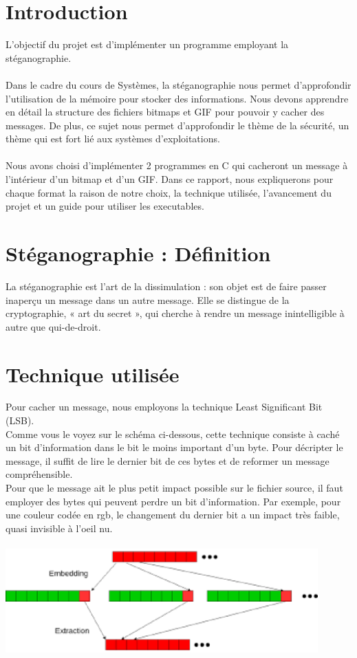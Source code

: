 \section{Introduction}
L'objectif du projet est d'implémenter un programme employant la stéganographie.\\\\
Dans le cadre du cours de Systèmes, la stéganographie nous permet d'approfondir l'utilisation de la mémoire pour stocker des informations. 
Nous devons apprendre en détail la structure des fichiers bitmaps et GIF pour pouvoir y cacher des messages. 
De plus, ce sujet nous permet d'approfondir le thème de la sécurité, un thème qui est fort lié aux systèmes d'exploitations.\\\\

Nous avons choisi d'implémenter 2 programmes en C qui cacheront un message à l'intérieur d'un bitmap et d'un GIF. 
Dans ce rapport, nous expliquerons pour chaque format la raison de notre choix, la technique utilisée, l'avancement du projet et un guide pour utiliser les executables. 


\section{Stéganographie : Définition}
La stéganographie est l'art de la dissimulation : son objet est de faire passer inaperçu un message dans un autre message. 
Elle se distingue de la cryptographie, « art du secret », qui cherche à rendre un message inintelligible à autre que qui-de-droit.\\


\section {Technique utilisée}
Pour cacher un message, nous employons la technique Least Significant Bit (LSB). \\

Comme vous le voyez sur le schéma ci-dessous, cette technique consiste à caché un bit d'information dans le bit le moins important d'un byte. 
Pour décripter le message, il suffit de lire le dernier bit de ces bytes et de reformer un message compréhensible.\\

Pour que le message ait le plus petit impact possible sur le fichier source, il faut employer des bytes qui peuvent perdre un bit d'information. 
Par exemple, pour une couleur codée en rgb, le changement du dernier bit a un impact très faible, quasi invisible à l'oeil nu.\\\\

\includegraphics[width=12cm]{lsb.eps}\\

